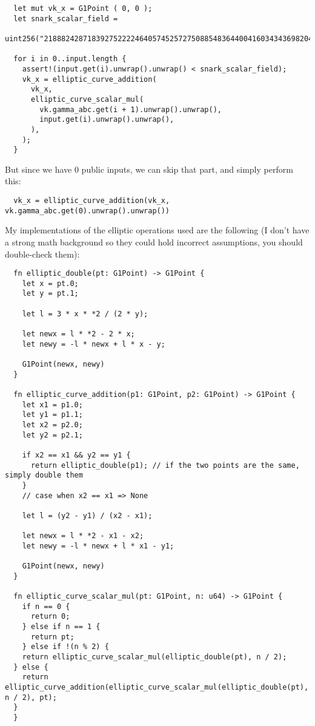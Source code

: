 \documentclass{article}
\begin{document}
\begin{lstlisting}
  let mut vk_x = G1Point ( 0, 0 );
  let snark_scalar_field =
  uint256("21888242871839275222246405745257275088548364400416034343698204186575808495617");
  
  for i in 0..input.length {  
    assert!(input.get(i).unwrap().unwrap() < snark_scalar_field);
    vk_x = elliptic_curve_addition(
      vk_x,
      elliptic_curve_scalar_mul(
        vk.gamma_abc.get(i + 1).unwrap().unwrap(),
        input.get(i).unwrap().unwrap(),
      ),
    );
  }
\end{lstlisting}

But since we have 0 public inputs, we can skip that part, and simply perform this:

\begin{lstlisting}
  vk_x = elliptic_curve_addition(vk_x, vk.gamma_abc.get(0).unwrap().unwrap())
\end{lstlisting}

My implementations of the elliptic operations used are the following (I don't have a strong math background so they could hold incorrect assumptions, you should double-check them):

\begin{lstlisting}
  fn elliptic_double(pt: G1Point) -> G1Point {
    let x = pt.0;
    let y = pt.1;

    let l = 3 * x * *2 / (2 * y);

    let newx = l * *2 - 2 * x;
    let newy = -l * newx + l * x - y;

    G1Point(newx, newy)
  }

  fn elliptic_curve_addition(p1: G1Point, p2: G1Point) -> G1Point {
    let x1 = p1.0;
    let y1 = p1.1;
    let x2 = p2.0;
    let y2 = p2.1;

    if x2 == x1 && y2 == y1 {
      return elliptic_double(p1); // if the two points are the same, simply double them
    }
    // case when x2 == x1 => None

    let l = (y2 - y1) / (x2 - x1);

    let newx = l * *2 - x1 - x2;
    let newy = -l * newx + l * x1 - y1;

    G1Point(newx, newy)
  }

  fn elliptic_curve_scalar_mul(pt: G1Point, n: u64) -> G1Point {
    if n == 0 {
      return 0;
    } else if n == 1 {
      return pt;
    } else if !(n % 2) {
    return elliptic_curve_scalar_mul(elliptic_double(pt), n / 2);
  } else {
    return elliptic_curve_addition(elliptic_curve_scalar_mul(elliptic_double(pt), n / 2), pt);
  }
  }
\end{lstlisting}
\end{document}
